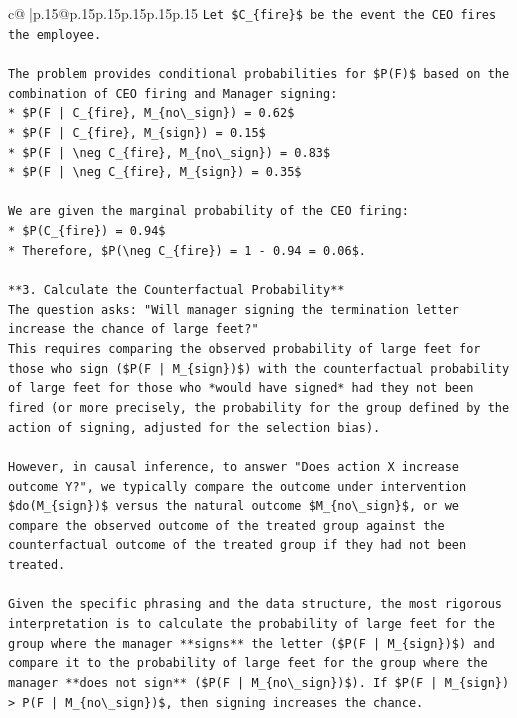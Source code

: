 \documentclass{article}
\begin{document}
{\begin{supertabular}{c@{$\;$}|p{.15\linewidth}@{}p{.15\linewidth}p{.15\linewidth}p{.15\linewidth}p{.15\linewidth}p{.15\linewidth}}
{{{\texttt{Let \$C\_\{fire\}\$ be the event the CEO fires the employee.} \\
\\ 
\texttt{The problem provides conditional probabilities for \$P(F)\$ based on the combination of CEO firing and Manager signing:} \\
\texttt{*   \$P(F | C\_\{fire\}, M\_\{no\textbackslash{}\_sign\}) = 0.62\$} \\
\texttt{*   \$P(F | C\_\{fire\}, M\_\{sign\}) = 0.15\$} \\
\texttt{*   \$P(F | \textbackslash{}neg C\_\{fire\}, M\_\{no\textbackslash{}\_sign\}) = 0.83\$} \\
\texttt{*   \$P(F | \textbackslash{}neg C\_\{fire\}, M\_\{sign\}) = 0.35\$} \\
\\ 
\texttt{We are given the marginal probability of the CEO firing:} \\
\texttt{*   \$P(C\_\{fire\}) = 0.94\$} \\
\texttt{*   Therefore, \$P(\textbackslash{}neg C\_\{fire\}) = 1 {-} 0.94 = 0.06\$.} \\
\\ 
\texttt{**3. Calculate the Counterfactual Probability**} \\
\texttt{The question asks: "Will manager signing the termination letter increase the chance of large feet?"} \\
\texttt{This requires comparing the observed probability of large feet for those who sign (\$P(F | M\_\{sign\})\$) with the counterfactual probability of large feet for those who *would have signed* had they not been fired (or more precisely, the probability for the group defined by the action of signing, adjusted for the selection bias).} \\
\\ 
\texttt{However, in causal inference, to answer "Does action X increase outcome Y?", we typically compare the outcome under intervention \$do(M\_\{sign\})\$ versus the natural outcome \$M\_\{no\textbackslash{}\_sign\}\$, or we compare the observed outcome of the treated group against the counterfactual outcome of the treated group if they had not been treated.} \\
\\ 
\texttt{Given the specific phrasing and the data structure, the most rigorous interpretation is to calculate the probability of large feet for the group where the manager **signs** the letter (\$P(F | M\_\{sign\})\$) and compare it to the probability of large feet for the group where the manager **does not sign** (\$P(F | M\_\{no\textbackslash{}\_sign\})\$). If \$P(F | M\_\{sign\}) > P(F | M\_\{no\textbackslash{}\_sign\})\$, then signing increases the chance.} \\
}}}
\end{supertabular}}
\end{document}
